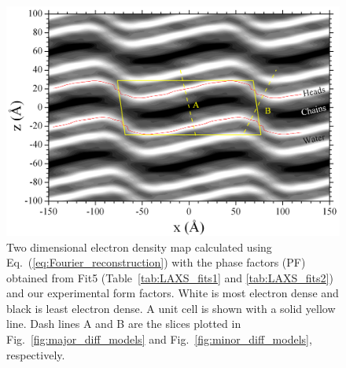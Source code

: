 \begin{landscape}
\begin{figure}[htbp]
  \centering
  \includegraphics[width=0.85\linewidth]{figures/ripple/LAXS/Fit5_2D_edp}
  \caption[Two dimensional electron density map calculated using Eq.~(\ref{eq:Fourier_reconstruction})
  with the phase factors (PF) obtained from Fit5 (Table~\ref{tab:LAXS_fits1} and \ref{tab:LAXS_fits2}) 
  and our experimental form factors]
  {Two dimensional electron density map calculated using Eq.~(\ref{eq:Fourier_reconstruction})
  with the phase factors (PF) obtained from Fit5 (Table~\ref{tab:LAXS_fits1} and \ref{tab:LAXS_fits2}) 
  and our experimental form factors. 
  White is most electron dense and black is least electron dense. 
  A unit cell is shown with a solid yellow line. 
  Dash lines A and B are the slices plotted in  Fig.~\ref{fig:major_diff_models} 
  and Fig.~\ref{fig:minor_diff_models}, respectively.}
  \label{fig:Fit5_2D_edp}
\end{figure}
\end{landscape}

